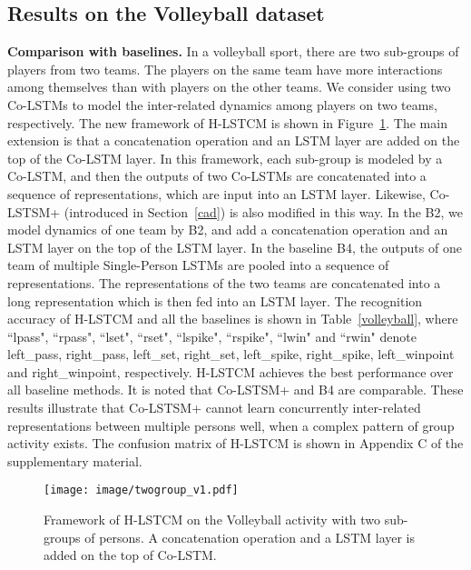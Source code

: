 \documentclass[9pt,journal,letterpaper,twocolumn]{IEEEtran}
\begin{document}
	
	{ \subsection{Results on the Volleyball dataset}		
		{\bf Comparison with baselines.} In a volleyball sport, there are two sub-groups of players from two teams. The players on the same team have more interactions among themselves than with players on the other teams. We consider using two Co-LSTMs to model the inter-related dynamics among players on two teams, respectively. The new framework of H-LSTCM is shown in Figure~\ref{twogroup}. The main extension is that a concatenation operation and an LSTM layer are added on the top of the Co-LSTM layer. In this framework, each sub-group is modeled by a Co-LSTM, and then the outputs of two Co-LSTMs are concatenated into a sequence of representations, which are input into an LSTM layer. Likewise, Co-LSTSM+ (introduced in Section~\ref{cad}) is also modified in this way. In the B2, we model dynamics of one team by B2, and add a concatenation operation and an LSTM layer on the top of the LSTM layer. In the baseline B4, the outputs of one team of multiple Single-Person LSTMs are pooled into a sequence of representations. The representations of the two teams are concatenated into a long representation which is then fed into an LSTM layer. The recognition accuracy of H-LSTCM and all the baselines is shown in Table~\ref{volleyball}, where ``lpass", ``rpass", ``lset", ``rset", ``lspike", ``rspike", ``lwin" and ``rwin" denote left\_pass, right\_pass, left\_set,  right\_set, left\_spike, right\_spike, left\_winpoint and right\_winpoint, respectively. H-LSTCM achieves the best performance over all baseline methods. It is noted that Co-LSTSM+ and B4 are comparable. These results illustrate that Co-LSTSM+ cannot learn concurrently inter-related representations between multiple persons well, when a complex pattern of group activity exists. The confusion matrix of H-LSTCM is shown in Appendix C of the supplementary material.   
		
		
		
		\begin{figure}[!t]
		\centering \texttt{[image: image/twogroup\_v1.pdf]}
		\vspace{-3mm}
		\caption{{Framework of H-LSTCM on the Volleyball activity with two sub-groups of persons. A concatenation operation and a LSTM layer is added on the top of Co-LSTM.}}\label{twogroup}
		\vspace{-3mm}
		

\end{figure}}
\end{document}
